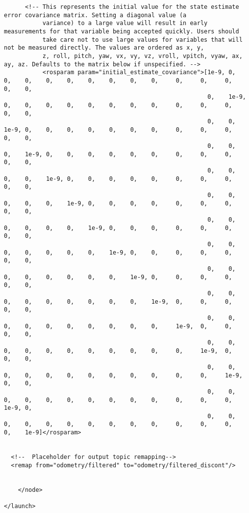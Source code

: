 \begin{verbatim}
      <!-- This represents the initial value for the state estimate error covariance matrix. Setting a diagonal value (a
           variance) to a large value will result in early measurements for that variable being accepted quickly. Users should
           take care not to use large values for variables that will not be measured directly. The values are ordered as x, y,
           z, roll, pitch, yaw, vx, vy, vz, vroll, vpitch, vyaw, ax, ay, az. Defaults to the matrix below if unspecified. -->
           <rosparam param="initial_estimate_covariance">[1e-9, 0,    0,    0,    0,    0,    0,    0,    0,    0,     0,     0,     0,    0,    0,
                                                          0,    1e-9, 0,    0,    0,    0,    0,    0,    0,    0,     0,     0,     0,    0,    0,
                                                          0,    0,    1e-9, 0,    0,    0,    0,    0,    0,    0,     0,     0,     0,    0,    0,
                                                          0,    0,    0,    1e-9, 0,    0,    0,    0,    0,    0,     0,     0,     0,    0,    0,
                                                          0,    0,    0,    0,    1e-9, 0,    0,    0,    0,    0,     0,     0,     0,    0,    0,
                                                          0,    0,    0,    0,    0,    1e-9, 0,    0,    0,    0,     0,     0,     0,    0,    0,
                                                          0,    0,    0,    0,    0,    0,    1e-9, 0,    0,    0,     0,     0,     0,    0,    0,
                                                          0,    0,    0,    0,    0,    0,    0,    1e-9, 0,    0,     0,     0,     0,    0,    0,
                                                          0,    0,    0,    0,    0,    0,    0,    0,    1e-9, 0,     0,     0,     0,    0,    0,
                                                          0,    0,    0,    0,    0,    0,    0,    0,    0,    1e-9,  0,     0,     0,    0,    0,
                                                          0,    0,    0,    0,    0,    0,    0,    0,    0,    0,     1e-9,  0,     0,    0,    0,
                                                          0,    0,    0,    0,    0,    0,    0,    0,    0,    0,     0,     1e-9,  0,    0,    0,
                                                          0,    0,    0,    0,    0,    0,    0,    0,    0,    0,     0,     0,     1e-9, 0,    0,
                                                          0,    0,    0,    0,    0,    0,    0,    0,    0,    0,     0,     0,     0,    1e-9, 0,
                                                          0,    0,    0,    0,    0,    0,    0,    0,    0,    0,     0,     0,     0,    0,    1e-9]</rosparam>


  <!--  Placeholder for output topic remapping-->
  <remap from="odometry/filtered" to="odometry/filtered_discont"/>
      

    </node>
    
</launch>

\end{verbatim}


